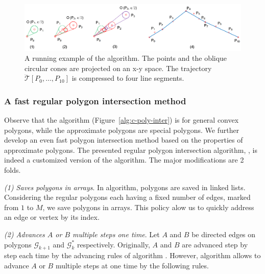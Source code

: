 \begin{figure}[tb!]
\centering
\includegraphics[scale=0.8]{figures/Fig-ex-conest.png}
\vspace{-1ex}
\caption{\small A running example of the \cist algorithm. The points and the oblique circular cones are projected on an x-y space. The trajectory $\dddot{\mathcal{T}}[P_0, \ldots, P_{10}]$ is compressed to four line segments.}
\vspace{-2ex}
\label{fig:exm-const}
\end{figure}



\subsubsection{A fast regular polygon intersection method}


Observe that the \cpia algorithm (Figure~\ref{alg:c-poly-inter}) is for general convex polygons, while the approximate polygons are special polygons. We further develop an even fast polygon intersection method based on the properties of approximate polygons.
%
The presented regular polygon intersection algorithm, \ie \rpia, is indeed a customized version of the \cpia algorithm.
The major modifications are 2 folds.

\ni \emph{{(1) Saves polygons in arrays}}.
In \cpia algorithm, polygons are saved in linked lists.
Considering the regular polygons each having a fixed number of edges, marked from $1$ to $M$, we save polygons in arrays. This policy alow us to quickly address an edge or vertex by its index.


\ni \emph{(2) Advances $A$ or $B$ multiple steps one time}.
Let $A$ and $B$ be directed edges on polygons $\mathcal{G}_{k+1}$ and $\mathcal{G}^*_k$ respectively.
Originally, $A$ and $B$ are advanced step by step each time by the advancing rules of algorithm \cpia .
%
However, algorithm \rpia allows to advance $A$ or $B$ multiple steps at one time by the following rules.

